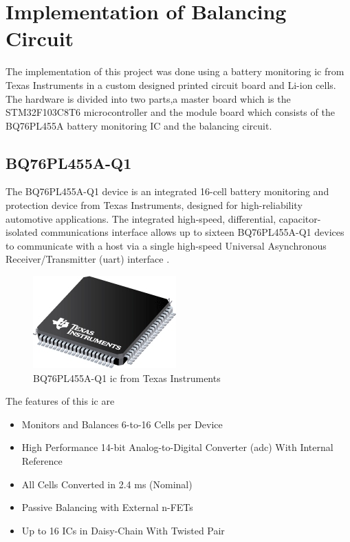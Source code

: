 
\chapter{Implementation of Balancing Circuit}

\indent\indent The implementation of this project was done using a battery monitoring \acrshort{ic} from Texas Instruments in a custom designed printed circuit board and Li-ion cells. The hardware is divided into two parts,a master board which is the STM32F103C8T6 microcontroller and the module board which consists of the BQ76PL455A battery monitoring IC and the balancing circuit.  



\section{BQ76PL455A-Q1}
The BQ76PL455A-Q1 device is an integrated 16-cell battery monitoring and protection device from Texas Instruments, designed for high-reliability automotive applications. The integrated high-speed, differential, capacitor-isolated communications interface allows up to sixteen BQ76PL455A-Q1 devices to communicate with a host via a single high-speed Universal Asynchronous Receiver/Transmitter (\acrshort{uart}) interface \cite{ti:pl455}.

\begin{figure}[!h]
    \centering
    \includegraphics[]{Chapter4/BQ76PL455A-Q1.jpg}
    \caption{BQ76PL455A-Q1 \acrshort{ic} from Texas Instruments \cite{ti:pl455}}
   
\end{figure}
The features of this \acrshort{ic} are 

\begin{itemize}
    \item Monitors and Balances 6-to-16 Cells per Device
    \item High Performance 14-bit Analog-to-Digital Converter (\acrshort{adc}) With Internal Reference 
    \item All Cells Converted in 2.4 ms (Nominal)
    \item Passive Balancing with External n-FETs
    \item Up to 16 ICs in Daisy-Chain With Twisted Pair
\end{itemize}

